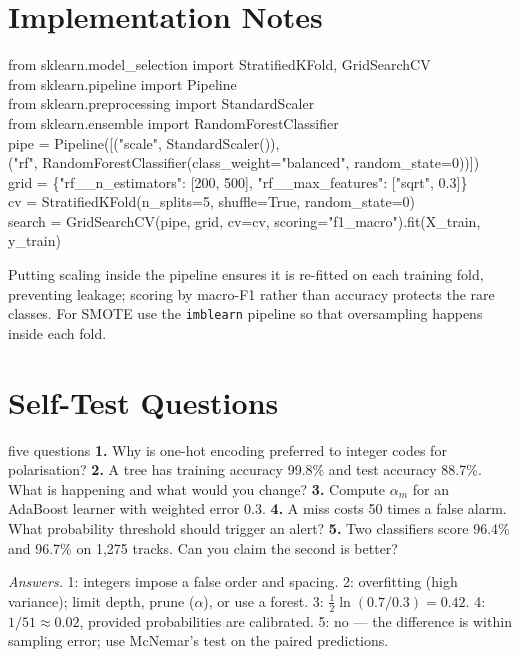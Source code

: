\documentclass[11pt]{article}
\begin{document}
\section{Implementation Notes}
\begin{center}\begin{minipage}{0.92\textwidth}\small\ttfamily
from sklearn.model\_selection import StratifiedKFold, GridSearchCV\\
from sklearn.pipeline import Pipeline\\
from sklearn.preprocessing import StandardScaler\\
from sklearn.ensemble import RandomForestClassifier\\[3pt]
pipe = Pipeline([("scale", StandardScaler()),\\
\hspace*{2em}("rf", RandomForestClassifier(class\_weight="balanced", random\_state=0))])\\
grid = \{"rf\_\_n\_estimators": [200, 500], "rf\_\_max\_features": ["sqrt", 0.3]\}\\
cv = StratifiedKFold(n\_splits=5, shuffle=True, random\_state=0)\\
search = GridSearchCV(pipe, grid, cv=cv, scoring="f1\_macro").fit(X\_train, y\_train)
\end{minipage}\end{center}
Putting scaling inside the pipeline ensures it is re-fitted on each training fold, preventing leakage; scoring by macro-F1 rather than accuracy protects the rare classes. For SMOTE use the \texttt{imblearn} pipeline so that oversampling happens inside each fold.

\section{Self-Test Questions}
\begin{question}{five questions}
\textbf{1.} Why is one-hot encoding preferred to integer codes for polarisation? \textbf{2.} A tree has training accuracy 99.8\% and test accuracy 88.7\%. What is happening and what would you change? \textbf{3.} Compute $\alpha_m$ for an AdaBoost learner with weighted error 0.3. \textbf{4.} A miss costs 50 times a false alarm. What probability threshold should trigger an alert? \textbf{5.} Two classifiers score 96.4\% and 96.7\% on 1,275 tracks. Can you claim the second is better?

\textit{Answers.} 1: integers impose a false order and spacing. 2: overfitting (high variance); limit depth, prune ($\alpha$), or use a forest. 3: $\tfrac12\ln(0.7/0.3)=0.42$. 4: $1/51\approx0.02$, provided probabilities are calibrated. 5: no --- the difference is within sampling error; use McNemar's test on the paired predictions.
\end{question}
\end{document}
